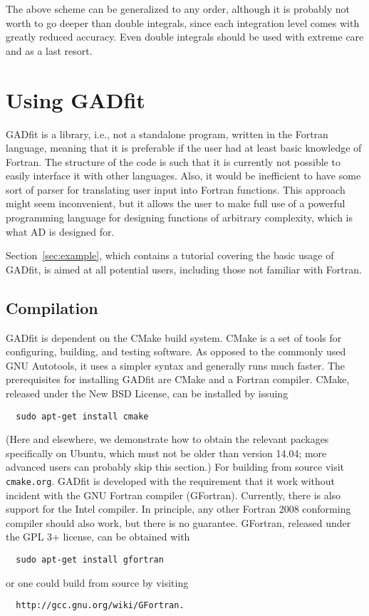 \documentclass{article}
\begin{document}
The above scheme can be generalized to any order, although it is
probably not worth to go deeper than double integrals, since each
integration level comes with greatly reduced accuracy. Even double
integrals should be used with extreme care and as a last resort.

\section{Using GADfit}

GADfit is a library, i.e., not a standalone program, written in the
Fortran language, meaning that it is preferable if the user had at
least basic knowledge of Fortran. The structure of the code is such
that it is currently not possible to easily interface it with other
languages. Also, it would be inefficient to have some sort of parser
for translating user input into Fortran functions. This approach might
seem inconvenient, but it allows the user to make full use of a
powerful programming language for designing functions of arbitrary
complexity, which is what AD is designed for.

Section~\ref{sec:example}, which contains a tutorial covering the
basic usage of GADfit, is aimed at all potential users, including
those not familiar with Fortran.

\subsection{Compilation}

GADfit is dependent on the CMake build system. CMake is a set of tools
for configuring, building, and testing software. As opposed to the
commonly used GNU Autotools, it uses a simpler syntax and generally
runs much faster. The prerequisites for installing GADfit are CMake
and a Fortran compiler. CMake, released under the New BSD License, can
be installed by issuing
\begin{verbatim}
  sudo apt-get install cmake
\end{verbatim}
(Here and elsewhere, we demonstrate how to obtain the relevant
packages specifically on Ubuntu, which must not be older than version
14.04; more advanced users can probably skip this section.) For
building from source visit \texttt{cmake.org}. GADfit is developed
with the requirement that it work without incident with the GNU
Fortran compiler (GFortran). Currently, there is also support for the
Intel compiler. In principle, any other Fortran 2008 conforming
compiler should also work, but there is no guarantee. GFortran,
released under the GPL 3+ license, can be obtained with
\begin{verbatim}
  sudo apt-get install gfortran
\end{verbatim}
or one could build from source by visiting
\begin{verbatim}
  http://gcc.gnu.org/wiki/GFortran.
\end{verbatim}
\end{document}
